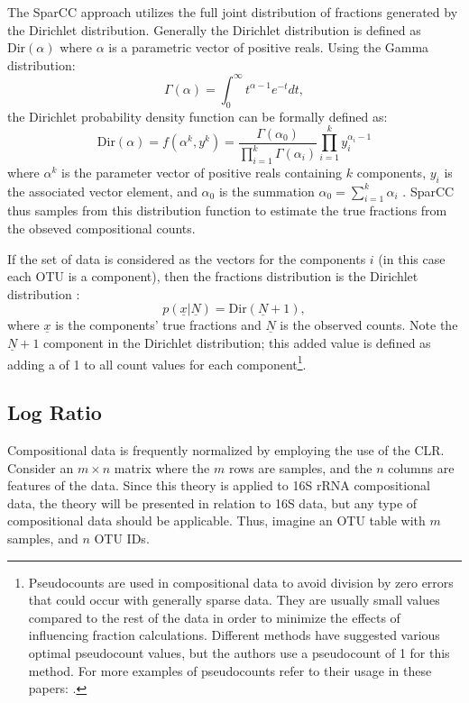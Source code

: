 The SparCC approach utilizes the full joint distribution of fractions generated by the Dirichlet distribution. Generally the Dirichlet distribution is defined as $\text{Dir}\left(\alpha\right)$ where $\alpha$ is a parametric vector of positive reals. Using the Gamma distribution:
\begin{equation}\label{eq:gamma}
    \Gamma\left(\alpha\right) = \int_0^{\infty} t^{\alpha-1} e^{-t} dt,
\end{equation}
the Dirichlet probability density function can be formally defined as:
\begin{equation}\label{eq:-dirich}
    \text{Dir}\left( \alpha \right) = f\left(\alpha^k, y^k\right) = \frac{\Gamma \left( \alpha_0 \right)}{\prod^k_{i=1}\Gamma \left( \alpha_i \right)} \prod_{i=1}^k y_i^{\alpha_i -1}
\end{equation}
where $\alpha^k$ is the parameter vector of positive reals containing $k$ components, $y_i$ is the associated vector element, and $\alpha_0$ is the summation $\alpha_0 = \sum_{i=1}^k \alpha_i$ \citep{Lin2016}. SparCC thus samples from this distribution function to estimate the true fractions from the obseved compositional counts. 

If the set of data is considered as the vectors for the components $i$ (in this case each \acrshort{OTU} is a component), then the fractions distribution is the Dirichlet distribution \citep{Gelman2013}:
\begin{equation}\label{eq:dirichlet}
    p\left(\underline{x}|\underline{N}\right)=\text{Dir}\left(\underline{N}+1\right),
\end{equation}
where $\underline{x}$ is the components' true fractions and $\underline{N}$ is the observed counts. Note the $\underline{N}+1$ component in the Dirichlet distribution; this added value is defined as adding a  of 1 to all count values for each component\footnote{Pseudocounts are used in compositional data to avoid division by zero errors that could occur with generally sparse data. They are usually small values compared to the rest of the data in order to minimize the effects of influencing fraction calculations. Different methods have suggested various optimal pseudocount values, but the authors use a pseudocount of 1 for this method. For more examples of pseudocounts refer to their usage in these papers: \citet{Weiss2017, Mandal2015, Wang2017}.}.


\subsection{Log Ratio}\label{theory-log}
Compositional data is frequently normalized by employing the use of the \acrlong{CLR}. Consider an $m \times n$ matrix where the $m$ rows are samples, and the $n$ columns are features of the data. Since this theory is applied to 16S \acrshort{rRNA} compositional data, the theory will be presented in relation to 16S data, but any type of compositional data should be applicable. Thus, imagine an \acrshort{OTU} table with $m$ samples, and $n$ \acrshort{OTU} IDs.

